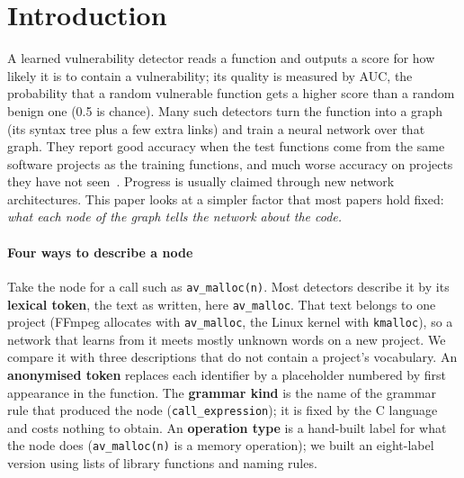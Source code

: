 \documentclass[pdflatex,sn-basic]{sn-jnl}
\theoremstyle{thmstyleone}%
\begin{document}
\section{Introduction}

A learned vulnerability detector reads a function and outputs a score for how
likely it is to contain a vulnerability; its quality is measured by AUC, the
probability that a random vulnerable function gets a higher score than a random
benign one (0.5 is chance). Many such detectors turn the function
into a graph (its syntax tree plus a few extra links) and train a neural
network over that graph. They report good accuracy when the test functions come
from the same software projects as the training functions, and much worse
accuracy on projects they have not seen~\citep{chakraborty2022deep,
chakraborty2024realvul, ding2025primevul}. Progress is usually claimed through
new network architectures. This paper looks at a simpler factor that most
papers hold fixed: \emph{what each node of the graph tells the network about the
code.}

\paragraph{Four ways to describe a node} Take the node for a call such as
\texttt{av\_malloc(n)}. Most detectors describe it by its \textbf{lexical
token}, the text as written, here \texttt{av\_malloc}. That text belongs to one
project (FFmpeg allocates with \texttt{av\_malloc}, the Linux kernel with
\texttt{kmalloc}), so a network that learns from it meets mostly unknown words
on a new project. We compare it with three descriptions that do not contain a
project's vocabulary. An \textbf{anonymised token} replaces each identifier by
a placeholder numbered by first appearance in the function. The \textbf{grammar
kind} is the name of the grammar rule that produced the node
(\texttt{call\_expression}); it is fixed by the C language and costs nothing to
obtain. An \textbf{operation type} is a hand-built label for what the node does
(\texttt{av\_malloc(n)} is a memory operation); we built an eight-label version
using lists of library functions and naming rules.
\end{document}
